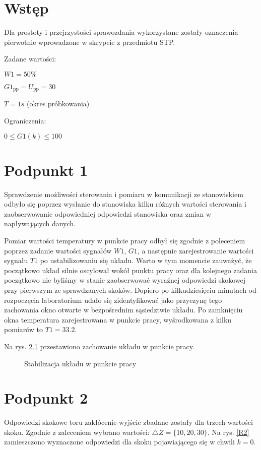 \chapter{Wstęp}
Dla prostoty i przejrzystości sprawozdania wykorzystane zostały oznaczenia pierwotnie wprowadzone w skrypcie z przedmiotu STP.

\bigskip

Zadane wartości:

\smallskip

$W1=50\%$

\smallskip

$G1_{\mathrm{pp}}=U_{\mathrm{pp}}=30$

\smallskip

$T=1s$ (okres próbkowania)

\bigskip

Ograniczenia:

\smallskip

$0 \le G1(k) \le 100$

\chapter{Podpunkt 1}
Sprawdzenie możliwości sterowania i pomiaru w komunikacji ze stanowiskiem odbyło się poprzez wysłanie do stanowiska kilku różnych wartości sterowania i zaobserwowanie odpowiedniej odpowiedzi stanowiska oraz zmian w napływających danych.

Pomiar wartości temperatury w punkcie pracy odbył się zgodnie z poleceniem poprzez zadanie wartości sygnałów $W1$, $G1$, a następnie zarejestrowanie wartości sygnału $T1$ po ustabilizowaniu się układu. Warto w tym momencie zauważyć, że początkowo układ silnie oscylował wokół punktu pracy oraz dla kolejnego zadania początkowo nie byliśmy w stanie zaobserwować wyraźnej odpowiedzi skokowej przy pierwszym ze sprawdzanych skoków. Dopiero po kilkudziesięciu minutach od rozpoczęcia laboratorium udało się zidentyfikować jako przyczynę tego zachowania okno otwarte w bezpośrednim sąsiedztwie układu. Po zamknięciu okna temperatura zarejestrowana w punkcie pracy, wyśrodkowana z kilku pomiarów to $T1=\num{33,2}$.

Na rys. \ref{R1} przestawiono zachowanie układu w punkcie pracy.

\begin{figure}[ht]
\centering

\caption{Stabilizacja układu w punkcie pracy}
\label{R1}
\end{figure}

\chapter{Podpunkt 2}
Odpowiedzi skokowe toru zakłócenie-wyjście zbadane zostały dla trzech wartości skoku. Zgodnie z zaleceniem wybrano wartości: $\triangle Z = \{10, 20, 30\}$. Na rys. \ref{R2} zamieszczono wyznaczone odpowiedzi dla skoku pojawiającego się w chwili $k=\num{0}$.


